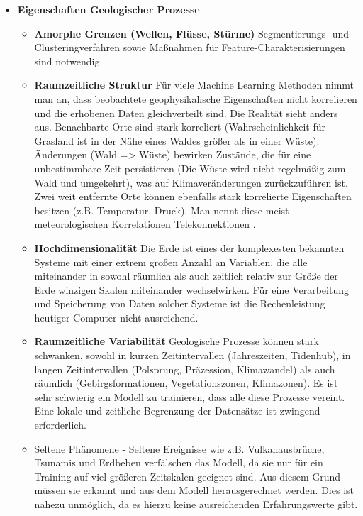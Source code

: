 \documentclass[11pt,ceqn]{book}
\begin{document}
\begin{itemize}
\item \textbf{Eigenschaften Geologischer Prozesse}
\begin{itemize}\item \textbf{Amorphe Grenzen (Wellen, Flüsse, Stürme)} Segmentierungs- und Clusteringverfahren sowie Maßnahmen für Feature-Charakterisierungen sind notwendig.
\item \textbf{Raumzeitliche Struktur}  
Für viele Machine Learning Methoden nimmt man an, dass beobachtete geophysikalische Eigenschaften nicht korrelieren und die erhobenen Daten gleichverteilt sind. Die Realität sieht anders aus. 
Benachbarte Orte sind stark korreliert (Wahrscheinlichkeit für Grasland ist in der Nähe eines Waldes größer als in einer Wüste). Änderungen (Wald => Wüste) bewirken Zustände, die für eine unbestimmbare Zeit persistieren (Die Wüste wird nicht regelmäßig zum Wald und umgekehrt), was auf Klimaveränderungen zurückzuführen ist.
Zwei weit entfernte Orte können ebenfalls stark korrelierte Eigenschaften besitzen (z.B. Temperatur, Druck). Man nennt diese meist meteorologischen Korrelationen Telekonnektionen .
\item \textbf{Hochdimensionalität} Die Erde ist eines der komplexesten bekannten Systeme mit einer extrem großen Anzahl an Variablen, die alle miteinander in sowohl räumlich als auch zeitlich relativ zur Größe der Erde winzigen Skalen miteinander wechselwirken. Für eine Verarbeitung und Speicherung von Daten solcher Systeme ist die Rechenleistung heutiger Computer nicht ausreichend.
\item \textbf{Raumzeitliche Variabilität} Geologische Prozesse können stark schwanken, sowohl in kurzen Zeitintervallen (Jahreszeiten, Tidenhub), in langen Zeitintervallen (Polsprung, Präzession, Klimawandel) als auch räumlich (Gebirgsformationen, Vegetationszonen, Klimazonen). Es ist sehr schwierig ein Modell zu trainieren, dass alle diese Prozesse vereint. Eine lokale und zeitliche Begrenzung der Datensätze ist zwingend erforderlich.
\item Seltene Phänomene - Seltene Ereignisse wie z.B. Vulkanausbrüche, Tsunamis und Erdbeben verfälschen das Modell, da sie nur für ein Training auf viel größeren Zeitskalen geeignet sind. Aus diesem Grund müssen sie erkannt und aus dem Modell herausgerechnet werden. Dies ist nahezu unmöglich, da es hierzu keine ausreichenden Erfahrungswerte gibt.
\end{itemize}


\end{itemize}
\end{document}
